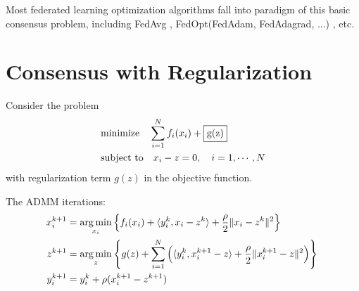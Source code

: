 \begin{remark}
Most federated learning optimization algorithms fall into paradigm of this basic consensus problem, including FedAvg \cite{mcmahan2017fed_avg}, FedOpt(FedAdam, FedAdagrad, ...) \cite{reddi2020fed_opt}, etc.
\end{remark}

\section{Consensus with Regularization}

Consider the problem
\begin{align*}
    & \text{minimize} \quad \sum\limits_{i=1}^N f_i(x_i) + \framebox{g(z)} \tikz[overlay, remember picture]{\node[] (cc_item) {}} \\
    & \text{subject to} \quad x_i-z = 0, \quad i=1,\cdots,N
\end{align*}
with regularization term $g(z)$ in the objective function.

The ADMM iterations:
\begin{align*}
x^{k+1}_i & = \argmin\limits_{x_i} \left\{ f_i(x_i) + \langle y_i^k, x_i-z^k \rangle + \dfrac{\rho}{2}\lVert x_i-z^k \rVert^2 \right\} \\
z^{k+1} & = \argmin\limits_{z} \left\{ g(z) + \sum\limits_{i=1}^N \left( \langle y_i^k, x_i^{k+1}-z \rangle + \dfrac{\rho}{2}\lVert x_i^{k+1}-z \rVert^2 \right) \right\} \tikz[overlay, remember picture]{\node[] (update_z) {}} \\
y_i^{k+1} & = y_i^k + \rho (x^{k+1}_i-z^{k+1})
\end{align*}

